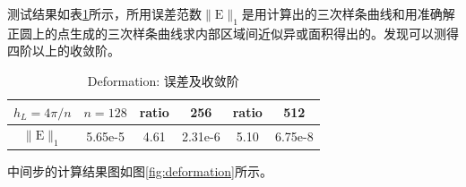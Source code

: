 \documentclass[a4paper,twoside]{ctexart}
\begin{document}
测试结果如表\ref{tab:deformation2}所示，所用误差范数$\|\mathrm{E}\|_1$是用计算出的三次样条曲线和用准确解正圆上的点生成的三次样条曲线求内部区域间近似异或面积得出的。发现可以测得四阶以上的收敛阶。

\begin{table}[htbp]
    \centering\begin{tabular}{c|ccccc}
        \hline
        $h_L=4\pi/n$&$n=128$&ratio&256&ratio&512\\
        \hline
        $\|\mathrm{E}\|_1$&5.65e-5&4.61&2.31e-6&5.10&6.75e-8\\
        \hline
    \end{tabular}
    \caption{Deformation: 误差及收敛阶}
    \label{tab:deformation2}
\end{table}

中间步的计算结果图如图\ref{fig:deformation}所示。
\end{document}
